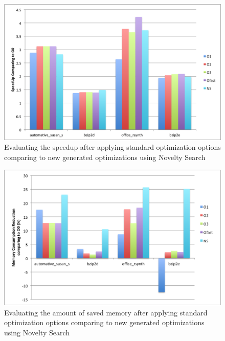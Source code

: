 \begin{figure}[h]
	\centering
	\includegraphics[scale=0.50]{Ressources/infra_novelty_stat2.png}
	\caption{Evaluating the speedup after applying standard optimization options comparing to new generated optimizations using Novelty Search}
\end{figure}
\begin{figure}[h]
	\centering
	\includegraphics[scale=0.50]{Ressources/infra_novelty_stat3.png}
	\caption{Evaluating the amount of saved memory after applying standard optimization options comparing to new generated optimizations using Novelty Search}
\end{figure}